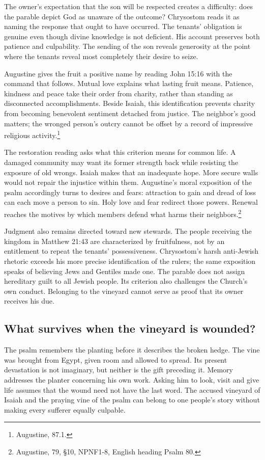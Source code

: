 The owner's expectation that the son will be respected creates a difficulty: does the parable depict God as unaware of the outcome? Chrysostom reads it as naming the response that ought to have occurred. The tenants' obligation is genuine even though divine knowledge is not deficient. His account preserves both patience and culpability. The sending of the son reveals generosity at the point where the tenants reveal most completely their desire to seize.

Augustine gives the fruit a positive name by reading John 15:16 with the command that follows. Mutual love explains what lasting fruit means. Patience, kindness and peace take their order from charity, rather than standing as disconnected accomplishments. Beside Isaiah, this identification prevents charity from becoming benevolent sentiment detached from justice. The neighbor's good matters; the wronged person's outcry cannot be offset by a record of impressive religious activity.\footnote{Augustine,  87.1.}

The restoration reading asks what this criterion means for common life. A damaged community may want its former strength back while resisting the exposure of old wrongs. Isaiah makes that an inadequate hope. More secure walls would not repair the injustice within them. Augustine's moral exposition of the psalm accordingly turns to desires and fears: attraction to gain and dread of loss can each move a person to sin. Holy love and fear redirect those powers. Renewal reaches the motives by which members defend what harms their neighbors.\footnote{Augustine,  79, §10, NPNF1-8, English heading Psalm 80.}

Judgment also remains directed toward new stewards. The people receiving the kingdom in Matthew 21:43 are characterized by fruitfulness, not by an entitlement to repeat the tenants' possessiveness. Chrysostom's harsh anti-Jewish rhetoric exceeds his more precise identification of the rulers; the same exposition speaks of believing Jews and Gentiles made one. The parable does not assign hereditary guilt to all Jewish people. Its criterion also challenges the Church's own conduct. Belonging to the vineyard cannot serve as proof that its owner receives his due.

\subsection{What survives when the vineyard is wounded?}
The psalm remembers the planting before it describes the broken hedge. The vine was brought from Egypt, given room and allowed to spread. Its present devastation is not imaginary, but neither is the gift preceding it. Memory addresses the planter concerning his own work. Asking him to look, visit and give life assumes that the wound need not have the last word. The accused vineyard of Isaiah and the praying vine of the psalm can belong to one people's story without making every sufferer equally culpable.

